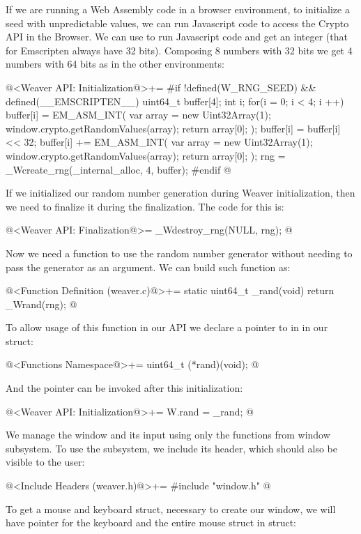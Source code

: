 If we are running a Web Assembly code in a browser environment, to
initialize a seed with unpredictable values, we can run Javascript
code to access the Crypto API in the Browser. We can
use  to run Javascript code and get an
integer (that for Emscripten always have 32 bits). Composing 8 numbers
with 32 bits we get 4 numbers with 64 bits as in the other
environments:

\iniciocodigo
@<Weaver API: Initialization@>+=
#if !defined(W_RNG_SEED) && defined(__EMSCRIPTEN__)
{
  uint64_t buffer[4];
  int i;
  for(i = 0; i < 4; i ++){
    buffer[i] = EM_ASM_INT({
      var array = new Uint32Array(1);
      window.crypto.getRandomValues(array);
      return array[0];
    });
    buffer[i] = buffer[i] << 32;
    buffer[i] += EM_ASM_INT({
      var array = new Uint32Array(1);
      window.crypto.getRandomValues(array);
      return array[0];
    });
  }
  rng = _Wcreate_rng(_internal_alloc, 4, buffer);
}
#endif
@
\fimcodigo

If we initialized our random number generation during Weaver
initialization, then we need to finalize it during the
finalization. The code for this is:

\iniciocodigo
@<Weaver API: Finalization@>=
_Wdestroy_rng(NULL, rng);
@
\fimcodigo

Now we need a function to use the random number generator without
needing to pass the generator as an argument. We can build such
function as:

\iniciocodigo
@<Function Definition (weaver.c)@>+=
static uint64_t _rand(void){
  return _Wrand(rng);
}
@
\fimcodigo

To allow usage of this function in our API we declare a pointer to in
in our  struct:

\iniciocodigo
@<Functions Namespace@>+=
uint64_t (*rand)(void);
@
\fimcodigo

And the pointer can be invoked after this initialization:

\iniciocodigo
@<Weaver API: Initialization@>+=
W.rand = _rand;
@
\fimcodigo


We manage the window and its input using only the functions from
window subsystem. To use the subsystem, we include its header, which
should also be visible to the user:

\iniciocodigo
@<Include Headers (weaver.h)@>+=
#include "window.h"
@
\fimcodigo

To get a mouse and keyboard struct, necessary to create our window, we
will have pointer for the keyboard and the entire mouse struct
in  struct:

